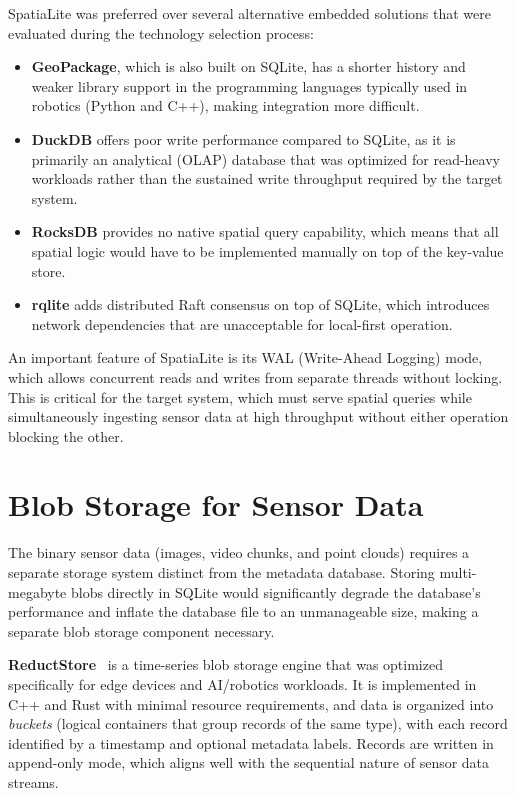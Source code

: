 SpatiaLite was preferred over several alternative embedded solutions that were evaluated during the technology selection process:
\begin{itemize}
    \item \textbf{GeoPackage}, which is also built on SQLite, has a shorter history and weaker library support in the programming languages typically used in robotics (Python and C++), making integration more difficult.
    \item \textbf{DuckDB} offers poor write performance compared to SQLite, as it is primarily an analytical (OLAP) database that was optimized for read-heavy workloads rather than the sustained write throughput required by the target system.
    \item \textbf{RocksDB} provides no native spatial query capability, which means that all spatial logic would have to be implemented manually on top of the key-value store.
    \item \textbf{rqlite} adds distributed Raft consensus on top of SQLite, which introduces network dependencies that are unacceptable for local-first operation.
\end{itemize}

An important feature of SpatiaLite is its WAL (Write-Ahead Logging) mode, which allows concurrent reads and writes from separate threads without locking. This is critical for the target system, which must serve spatial queries while simultaneously ingesting sensor data at high throughput without either operation blocking the other.


\section{Blob Storage for Sensor Data} \label{sec:blob-storage}

The binary sensor data (images, video chunks, and point clouds) requires a separate storage system distinct from the metadata database. Storing multi-megabyte blobs directly in SQLite would significantly degrade the database's performance and inflate the database file to an unmanageable size, making a separate blob storage component necessary.

\textbf{ReductStore}~\cite{reductstore2024benchmark} is a time-series blob storage engine that was optimized specifically for edge devices and AI/robotics workloads. It is implemented in C++ and Rust with minimal resource requirements, and data is organized into \emph{buckets} (logical containers that group records of the same type), with each record identified by a timestamp and optional metadata labels. Records are written in append-only mode, which aligns well with the sequential nature of sensor data streams.

